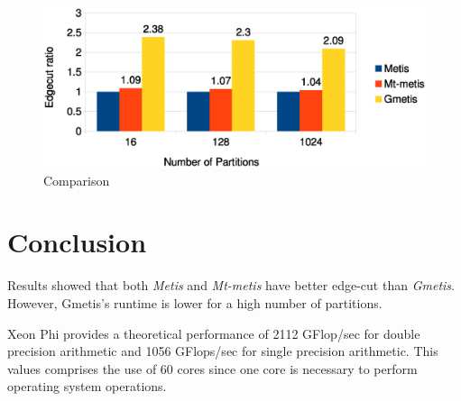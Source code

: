 \documentclass[abstract=on,9pt,twocolumn]{scrartcl}
\begin{document}
\begin{center}
\begin{figure}[htb]
    \includegraphics[width=\columnwidth]{img/edgecut.eps}
    \caption{Comparison}
    \label{img:edgecut}
\end{figure}
\end{center}



\section{Conclusion}
\label{sec:conc}
Results showed that both \textit{Metis} and \textit{Mt-metis} have
better edge-cut than \textit{Gmetis}. However, Gmetis's runtime is lower
for a high number of partitions.


Xeon Phi provides a theoretical performance of 2112 GFlop/sec for double
precision arithmetic and 1056 GFlops/sec for single precision
arithmetic. This values comprises the use of 60 cores since one core is
necessary to perform operating system operations.





\end{document}

